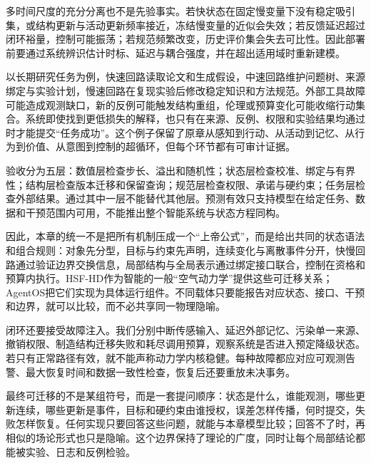 多时间尺度的充分分离也不是先验事实。若快状态在固定慢变量下没有稳定吸引集，或结构更新与活动更新频率接近，冻结慢变量的近似会失效；若反馈延迟超过闭环裕量，控制可能振荡；若规范频繁改变，历史评价集会失去可比性。因此部署前要通过系统辨识估计时标、延迟与耦合强度，并在超出适用域时重新建模。

以长期研究任务为例，快速回路读取论文和生成假设，中速回路维护问题树、来源绑定与实验计划，慢速回路在复现实验后修改稳定知识和方法规范。外部工具故障可能造成观测缺口，新的反例可能触发结构重组，伦理或预算变化可能收缩行动集合。系统即使找到更低损失的解释，也只有在来源、反例、权限和实验结果均通过时才能提交“任务成功”。这个例子保留了原章从感知到行动、从活动到记忆、从行为到价值、从意图到控制的超循环，但每个环节都有可审计证据。

验收分为五层：数值层检查步长、溢出和随机性；状态层检查校准、绑定与有界性；结构层检查版本迁移和保留查询；规范层检查权限、承诺与硬约束；任务层检查外部结果。通过其中一层不能替代其他层。预测有效只支持模型在给定任务、数据和干预范围内可用，不能推出整个智能系统与状态方程同构。

因此，本章的统一不是把所有机制压成一个“上帝公式”，而是给出共同的状态语法和组合规则：对象先分型，目标与约束先声明，连续变化与离散事件分开，快慢回路通过验证边界交换信息，局部结构与全局表示通过绑定接口联合，控制在资格和预算内执行。HSF-HD作为智能的一般“空气动力学”提供这些可迁移关系；AgentOS把它们实现为具体运行组件。不同载体只要能报告对应状态、接口、干预和边界，就可以比较，而不必共享同一物理隐喻。

闭环还要接受故障注入。我们分别中断传感输入、延迟外部记忆、污染单一来源、撤销权限、制造结构迁移失败和耗尽调用预算，观察系统是否进入预定降级状态。若只有正常路径有效，就不能声称动力学内核稳健。每种故障都应对应可观测告警、最大恢复时间和数据一致性检查，恢复后还要重放未决事务。

最终可迁移的不是某组符号，而是一套提问顺序：状态是什么，谁能观测，哪些更新连续，哪些更新是事件，目标和硬约束由谁授权，误差怎样传播，何时提交，失败怎样恢复。任何实现只要回答这些问题，就能与本章模型比较；回答不了时，再相似的场论形式也只是隐喻。这个边界保持了理论的广度，同时让每个局部结论都能被实验、日志和反例检验。
